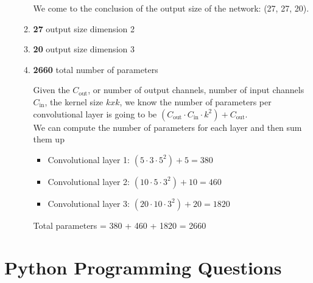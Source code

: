 \documentclass[12pt]{article}
\begin{document}
\begin{enumerate}
\begin{enumerate}
  We come to the conclusion of the output size of the network: (27, 27, 20).
  \item \textbf{27} output size dimension 2 
  \item \textbf{20} output size dimension 3
  \item \textbf{2660} total number of parameters

  Given the $C_{\text{out}}$, or number of output channels, number of input channels $C_{\text{in}}$, the kernel size $k x k$, we know the number of parameters 
  per convolutional layer is going to be $(C_{\text{out}} \cdot C_{\text{in}} \cdot k^2) + C_{\text{out}}$. \\

  We can compute the number of parameters for each layer and then sum them up \\ 
  \begin{itemize}
    \item Convolutional layer 1: $(5 \cdot 3 \cdot 5^2) + 5 = 380$
    \item Convolutional layer 2: $(10 \cdot 5 \cdot 3^2) + 10 = 460$
    \item Convolutional layer 3: $(20 \cdot 10 \cdot 3^2) + 20 = 1820$
  \end{itemize}

  Total parameters = 380 + 460 + 1820 = 2660

  \end{enumerate}
\end{enumerate}

\section{Python Programming Questions}
\end{document}

